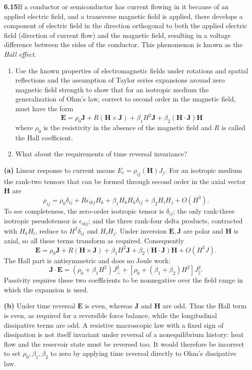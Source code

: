 \par\bigskip
\noindent\textbf{6.15}\quad If a conductor or semiconductor has current flowing in it because of an applied electric field, and a transverse magnetic field is applied, there develops a component of electric field in the direction orthogonal to both the applied electric field (direction of current flow) and the magnetic field, resulting in a voltage difference between the sides of the conductor. This phenomenon is known as the \emph{Hall effect}.
\begin{enumerate}
\item[(a)] Use the known properties of electromagnetic fields under rotations and spatial reflections and the assumption of Taylor series expansions around zero magnetic field strength to show that for an isotropic medium the generalization of Ohm's law, correct to second order in the magnetic field, must have the form
\[
\mathbf{E}=\rho_{0}\mathbf{J}+R(\mathbf{H}\times\mathbf{J})+\beta_{1}H^{2}\mathbf{J}+\beta_{2}(\mathbf{H}\cdot\mathbf{J})\mathbf{H}
\]
where $\rho_{0}$ is the resistivity in the absence of the magnetic field and $R$ is called the Hall coefficient.
\item[(b)] What about the requirements of time reversal invariance?
\end{enumerate}
\solution

\textbf{(a)} Linear response to current means $E_i=\rho_{ij}(\mathbf H)J_j$.
For an isotropic medium the rank-two tensors that can be formed through
second order in the axial vector $\mathbf H$ are
\[
\rho_{ij}=\rho_0\delta_{ij}
+R\epsilon_{ikj}H_k+\beta_1H_kH_k\delta_{ij}+\beta_2H_iH_j+O(H^3).
\]
To see completeness, the zero-order isotropic tensor is $\delta_{ij}$;
the only rank-three isotropic pseudotensor is $\epsilon_{ikj}$; and the
three rank-four delta products, contracted with $H_kH_l$, reduce to
$H^2\delta_{ij}$ and $H_iH_j$. Under inversion $\mathbf E,\mathbf J$
are polar and $\mathbf H$ is axial, so all these terms transform as required.
Consequently
\[
\boxed{\mathbf E=\rho_0\mathbf J+R(\mathbf H\times\mathbf J)
+\beta_1H^2\mathbf J+\beta_2(\mathbf H\cdot\mathbf J)\mathbf H+O(H^3J).}
\]
The Hall part is antisymmetric and does no Joule work:
\[
\mathbf J\cdot\mathbf E=(\rho_0+\beta_1H^2)J_\perp^2
+[\rho_0+(\beta_1+\beta_2)H^2]J_\parallel^2.
\]
Passivity requires these two coefficients to be nonnegative over the field
range in which the expansion is used.

\textbf{(b)} Under time reversal $\mathbf E$ is even, whereas $\mathbf J$
and $\mathbf H$ are odd. Thus the Hall term is even, as required for a
reversible force balance, while the longitudinal dissipative terms are odd.
A resistive macroscopic law with a fixed sign of dissipation is not itself
invariant under reversal of a nonequilibrium history: heat flow and the
reservoir state must be reversed too. It would therefore be incorrect to
set $\rho_0,\beta_1,\beta_2$ to zero by applying time reversal directly to
Ohm's dissipative law.

